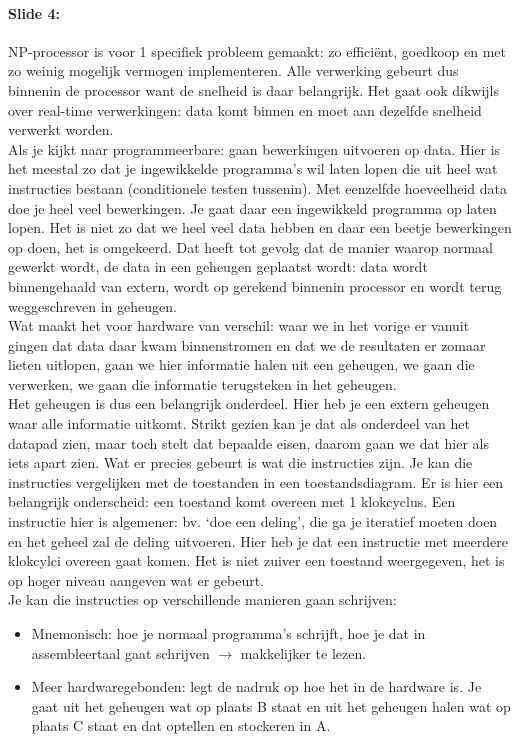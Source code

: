 \documentclass[10pt,a4paper]{book}
\begin{document}
\paragraph{Slide 4:} NP-processor is voor 1 specifiek probleem gemaakt: zo effici\"ent, goedkoop en met zo weinig mogelijk vermogen implementeren. Alle verwerking gebeurt dus binnenin de processor want de snelheid is daar belangrijk. Het gaat ook dikwijls over real-time verwerkingen: data komt binnen en moet aan dezelfde snelheid verwerkt worden.\\
Als je kijkt naar programmeerbare: gaan bewerkingen uitvoeren op data. Hier is het meestal zo dat je ingewikkelde programma's wil laten lopen die uit heel wat instructies bestaan (conditionele testen tussenin). Met eenzelfde hoeveelheid data doe je heel veel bewerkingen. Je gaat daar een ingewikkeld programma op laten lopen. Het is niet zo dat we heel veel data hebben en daar een beetje bewerkingen op doen, het is omgekeerd. Dat heeft tot gevolg dat de manier waarop normaal gewerkt wordt, de data in een geheugen geplaatst wordt: data wordt binnengehaald van extern, wordt op gerekend binnenin processor en wordt terug weggeschreven in geheugen.\\
Wat maakt het voor hardware van verschil: waar we in het vorige er vanuit gingen dat data daar kwam binnenstromen en dat we de resultaten er zomaar lieten uitlopen, gaan we hier informatie halen uit een geheugen, we gaan die verwerken, we gaan die informatie terugsteken in het geheugen. \\
Het geheugen is dus een belangrijk onderdeel. Hier heb je een extern geheugen waar alle informatie uitkomt. Strikt gezien kan je dat als onderdeel van het datapad zien, maar toch stelt dat bepaalde eisen, daarom gaan we dat hier als iets apart zien. Wat er precies gebeurt is wat die instructies zijn. Je kan die instructies vergelijken met de toestanden in een toestandsdiagram. Er is hier een belangrijk onderscheid: een toestand komt overeen met 1 klokcyclus. Een instructie hier is algemener: bv. `doe een deling', die ga je iteratief moeten doen en het geheel zal de deling uitvoeren. Hier heb je dat een instructie met meerdere klokcylci overeen gaat komen. Het is niet zuiver een toestand weergegeven, het is op hoger niveau aangeven wat er gebeurt.\\
Je kan die instructies op verschillende manieren gaan schrijven:
\begin{itemize}
\item Mnemonisch: hoe je normaal programma's schrijft, hoe je dat in assembleertaal gaat schrijven $\rightarrow$ makkelijker te lezen.
\item Meer hardwaregebonden: legt de nadruk op hoe het in de hardware is. Je gaat uit het geheugen wat op plaats B staat en uit het geheugen halen wat op plaats C staat en dat optellen en stockeren in A. 
\end{itemize}
\end{document}
